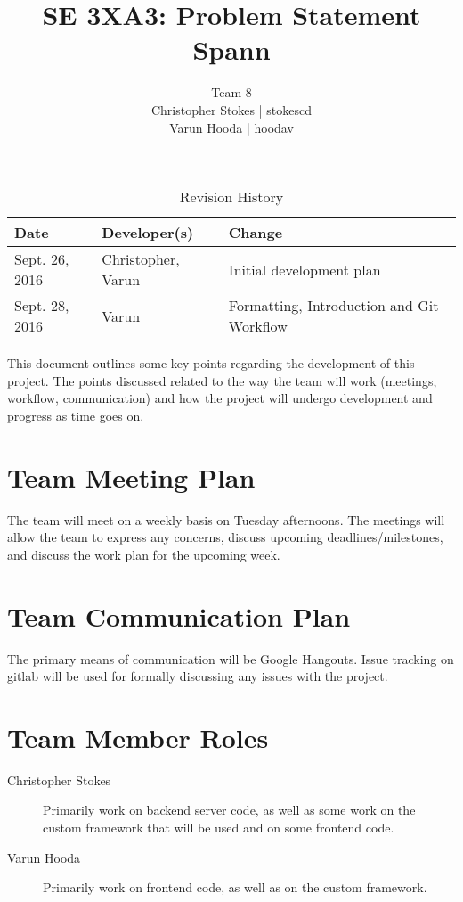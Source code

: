 \documentclass{article}
\title{SE 3XA3: Problem Statement\\Spann}
\author{Team 8
		\\ Christopher Stokes | stokescd
		\\ Varun Hooda | hoodav
}
\date{}
\begin{document}
\begin{table}[hp]
\caption{Revision History} \label{TblRevisionHistory}
\begin{tabularx}{\textwidth}{llX}
\toprule
\textbf{Date} & \textbf{Developer(s)} & \textbf{Change}\\
\midrule
    Sept. 26, 2016 & Christopher, Varun & Initial development plan\\
    Sept. 28, 2016 & Varun & Formatting, Introduction and Git Workflow\\
\bottomrule
\end{tabularx}
\end{table}

\newpage

\maketitle

This document outlines some key points regarding the development of this
project. The points discussed related to the way the team will work (meetings, workflow, communication) and how the project will undergo development and progress as time goes on.

\section{Team Meeting Plan}
The team will meet on a weekly basis on Tuesday afternoons. The meetings will
allow the team to express any concerns, discuss upcoming deadlines/milestones,
and discuss the work plan for the upcoming week.

\section{Team Communication Plan}
The primary means of communication will be Google Hangouts. Issue tracking on
gitlab will be used for formally discussing any issues with the project.

\section{Team Member Roles}
\begin{description}
  \item[Christopher Stokes] Primarily work on backend server code, as well as
    some work on the custom framework that will be used and on some frontend
    code.
  \item[Varun Hooda] Primarily work on frontend code, as well as on the custom
    framework.
\end{description}
\end{document}
